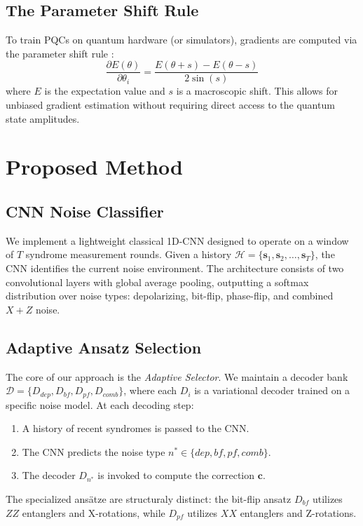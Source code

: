 \documentclass[journal,twocolumn]{IEEEtran}
\begin{document}
\subsection{The Parameter Shift Rule}
To train PQCs on quantum hardware (or simulators), gradients are computed via the parameter shift rule \cite{mitarai2018quantum}:
\begin{equation}
\frac{\partial E(\theta)}{\partial \theta_i} = \frac{E(\theta + s) - E(\theta - s)}{2\sin(s)}
\end{equation}
where $E$ is the expectation value and $s$ is a macroscopic shift. This allows for unbiased gradient estimation without requiring direct access to the quantum state amplitudes.

\section{Proposed Method}

\subsection{CNN Noise Classifier}
We implement a lightweight classical 1D-CNN designed to operate on a window of $T$ syndrome measurement rounds. Given a history $\mathcal{H} = \{\mathbf{s}_1, \mathbf{s}_2, \dots, \mathbf{s}_T\}$, the CNN identifies the current noise environment. The architecture consists of two convolutional layers with global average pooling, outputting a softmax distribution over noise types: depolarizing, bit-flip, phase-flip, and combined $X+Z$ noise.

\subsection{Adaptive Ansatz Selection}
The core of our approach is the \textit{Adaptive Selector}. We maintain a decoder bank $\mathcal{D} = \{D_{dep}, D_{bf}, D_{pf}, D_{comb}\}$, where each $D_i$ is a variational decoder trained on a specific noise model. At each decoding step:
\begin{enumerate}
    \item A history of recent syndromes is passed to the CNN.
    \item The CNN predicts the noise type $n^* \in \{dep, bf, pf, comb\}$.
    \item The decoder $D_{n^*}$ is invoked to compute the correction $\mathbf{c}$.
\end{enumerate}

The specialized ansätze are structuraly distinct: the bit-flip ansatz $D_{bf}$ utilizes $ZZ$ entanglers and X-rotations, while $D_{pf}$ utilizes $XX$ entanglers and Z-rotations.
\end{document}
